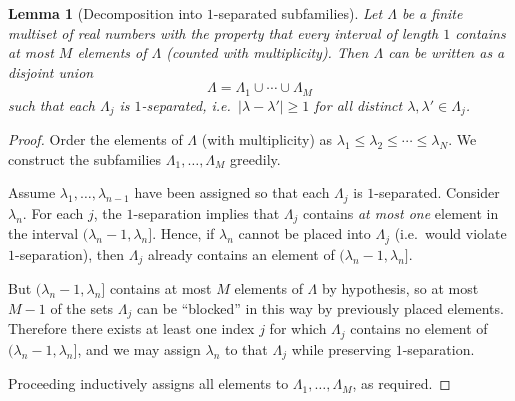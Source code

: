 \documentclass[11pt]{article}
\theoremstyle{plain}
\newtheorem{lemma}[theorem]{Lemma}
\theoremstyle{definition}
\begin{document}
\begin{lemma}[Decomposition into $1$-separated subfamilies]\label{lem:partition}
Let $\Lambda$ be a finite multiset of real numbers with the property that every interval of length $1$
contains at most $M$ elements of $\Lambda$ (counted with multiplicity). Then $\Lambda$ can be written
as a disjoint union
\[
  \Lambda=\Lambda_1\cup\cdots\cup \Lambda_M
\]
such that each $\Lambda_j$ is $1$-separated, i.e.\ $|\lambda-\lambda'|\ge 1$ for all distinct $\lambda,\lambda'\in\Lambda_j$.
\end{lemma}

\begin{proof}
Order the elements of $\Lambda$ (with multiplicity) as $\lambda_1\le \lambda_2\le \cdots\le \lambda_N$.
We construct the subfamilies $\Lambda_1,\dots,\Lambda_M$ greedily.

Assume $\lambda_1,\dots,\lambda_{n-1}$ have been assigned so that each $\Lambda_j$ is $1$-separated.
Consider $\lambda_n$. For each $j$, the $1$-separation implies that $\Lambda_j$ contains \emph{at most one}
element in the interval $(\lambda_n-1,\lambda_n]$.
Hence, if $\lambda_n$ cannot be placed into $\Lambda_j$ (i.e.\ would violate $1$-separation), then $\Lambda_j$
already contains an element of $(\lambda_n-1,\lambda_n]$.

But $(\lambda_n-1,\lambda_n]$ contains at most $M$ elements of $\Lambda$ by hypothesis, so at most $M-1$
of the sets $\Lambda_j$ can be ``blocked'' in this way by previously placed elements.
Therefore there exists at least one index $j$ for which $\Lambda_j$ contains no element of $(\lambda_n-1,\lambda_n]$,
and we may assign $\lambda_n$ to that $\Lambda_j$ while preserving $1$-separation.

Proceeding inductively assigns all elements to $\Lambda_1,\dots,\Lambda_M$, as required.
\end{proof}
\end{document}
